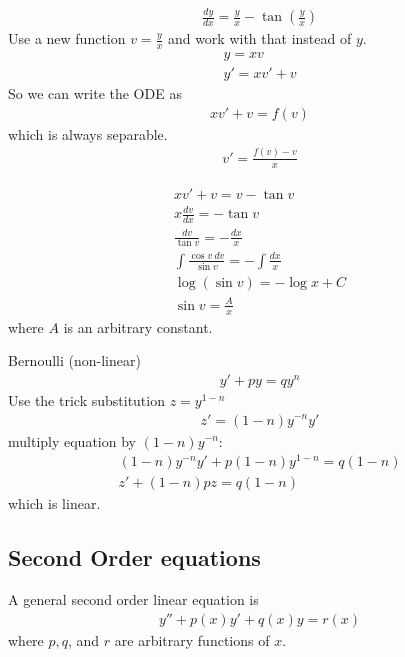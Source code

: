 \begin{ex}
	\begin{align*}
	\frac{dy}{dx} = \frac y x - \tan \left( \frac y x \right)
	\end{align*}
	Use a new function $v = \frac y x$ and work with that instead of $y$.
	\begin{align*}
	y= xv \\
	y' = xv' + v 
	\end{align*}
	So we can write the ODE as 
	\begin{align*}
	xv' + v = f(v)
	\end{align*}
	which is always separable. 
	\begin{align*}
	v' = \frac{f(v) - v} x
	\end{align*} 
	
	\begin{align*}
	xv' + v = v - \tan v \\
	x \frac{dv}{dx} = -\tan v \\
	\frac{dv}{\tan v} = - \frac{dx} x \\
	\int \frac{\cos v ~dv}{\sin v} = -\int \frac {dx} x \\
	\log(\sin v) = - \log x + C \\
	\sin v = \frac A x
	\end{align*}
	where $A$ is an arbitrary constant.
\end{ex}


Bernoulli (non-linear)
\begin{align*}
y' + py = qy^n
\end{align*}
Use the trick substitution $z = y^{1-n}$
\begin{align*}
z' = (1-n) y^{-n} y'
\end{align*}
multiply equation by $(1-n)y^{-n}$:
\begin{align*}
(1-n)y^{-n} y' + p(1-n)y^{1-n} = q(1-n) \\
z' + (1-n)pz = q(1-n)
\end{align*}
which is linear.

\subsection{Second Order equations}
\begin{df}
A general second order linear equation is
\begin{align*}
y'' + p(x) y' + q(x) y = r(x)
\end{align*} 
where $p,q$, and $r$ are arbitrary functions of $x$.
\end{df}

